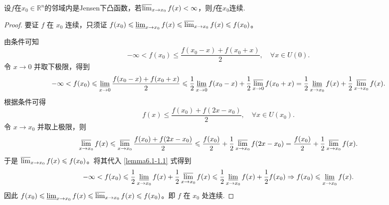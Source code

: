 \documentclass[lang=cn,newtx,10pt,scheme=chinese]{elegantbook}
\begin{document}
\begin{lemma}\label{lemma:关于Jesen下凸与连续的引理}
设\(f\)在\(x_0\in\mathbb{R}^n\)的邻域内是Jensen下凸函数，若\(\varlimsup_{x\rightarrow x_0}f(x)<\infty\)，则\(f\)在\(x_0\)连续.
\end{lemma}
\begin{proof}
要证 \(f\) 在 \(x_0\) 连续，只须证 \(f(x_0) \leqslant \varliminf_{x \to x_0} f(x) \leqslant \varlimsup_{x \to x_0} f(x) \leqslant f(x_0)\)。

由条件可知
\[
-\infty < f(x_0) \leqslant \frac{f(x_0 - x) + f(x_0 + x)}{2}, \quad \forall x \in U(0).
\]
令 \(x \to 0\) 并取下极限，得到
\begin{align}
-\infty < f(x_0) \leqslant \varliminf_{x \to 0} \frac{f(x_0 - x) + f(x_0 + x)}{2} 
\leqslant \frac{1}{2} \varliminf_{x \to 0} f(x_0 - x) + \frac{1}{2} \varlimsup_{x \to 0} f(x_0 + x) 
= \frac{1}{2} \varliminf_{x \to x_0} f(x) + \frac{1}{2} \varlimsup_{x \to x_0} f(x). \label{lemma6.1-1.1}
\end{align}
根据条件可得
\[
f(x) \leqslant \frac{f(x_0) + f(2x - x_0)}{2}, \quad \forall x \in U(x_0).
\]
令 \(x \to x_0\) 并取上极限，则
\begin{align*}
\varlimsup_{x \to x_0} f(x)\leqslant \varlimsup_{x \to x_0} \frac{f(x_0) + f(2x - x_0)}{2} 
\leqslant \frac{f(x_0)}{2} + \frac{1}{2} \varlimsup_{x \to x_0} f(2x - x_0) 
= \frac{f(x_0)}{2} + \frac{1}{2} \varlimsup_{x \to x_0} f(x).
\end{align*}
于是 \(\varlimsup_{x \to x_0} f(x) \leqslant f(x_0)\)。将其代入 \eqref{lemma6.1-1.1} 式得到
\begin{align*}
-\infty < f(x_0) \leqslant \frac{1}{2} \varliminf_{x \to x_0} f(x) + \frac{1}{2} \varlimsup_{x \to x_0} f(x) 
\leqslant \frac{1}{2} \varliminf_{x \to x_0} f(x) + \frac{1}{2} f(x_0) 
\Rightarrow f(x_0) \leqslant \varliminf_{x \to x_0} f(x).
\end{align*}
因此 \(f(x_0) \leqslant \varliminf_{x \to x_0} f(x) \leqslant \varlimsup_{x \to x_0} f(x) \leqslant f(x_0)\)。即 \(f\) 在 \(x_0\) 处连续.
\end{proof}
\end{document}
